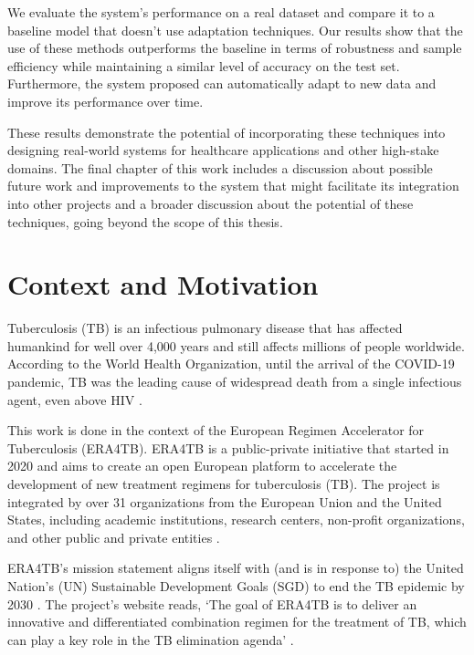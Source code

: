 \documentclass[../main.tex]{subfiles}
\begin{document}
 We evaluate the system's performance on a real dataset and compare it to a baseline model that doesn't use adaptation techniques.  Our results show that the use of these methods outperforms the baseline in terms of robustness and sample efficiency while maintaining a similar level of accuracy on the test set. Furthermore, the system proposed can automatically adapt to new data and improve its performance over time. 
 
 These results demonstrate the potential of incorporating these techniques into designing real-world systems for healthcare applications and other high-stake domains. The final chapter of this work includes a discussion about possible future work and improvements to the system that might facilitate its integration into other projects and a broader discussion about the potential of these techniques, going beyond the scope of this thesis.
    
 \section{Context and Motivation} \label{sec:motivation}

    Tuberculosis (TB) is an infectious pulmonary disease that has affected humankind for well over 4,000 years \cite{cdctb_world_2023} and still affects millions of people worldwide. According to the World Health Organization, until the arrival of the COVID-19 pandemic, TB was the leading cause of widespread death from a single infectious agent, even above HIV \cite{who_global_2022}.


    This work is done in the context of the European Regimen Accelerator for Tuberculosis (ERA4TB). ERA4TB is a public-private initiative that started in 2020 and aims to create an open European platform to accelerate the development of new treatment regimens for tuberculosis (TB). The project is integrated by over 31 organizations from the European Union and the United States, including academic institutions, research centers, non-profit organizations, and other public and private entities \cite{noauthor_era4tb}.
    
    ERA4TB's mission statement aligns itself with (and is in response to) the United Nation's (UN) Sustainable Development Goals (SGD) to end the TB epidemic by 2030 \cite{world_health_organization_regional_office_for_europe_tuberculosis_2017}. The project's website reads, `The goal of ERA4TB is to deliver an innovative and differentiated combination regimen for the treatment of TB, which can play a key role in the TB elimination agenda' \cite{noauthor_era4tb}.
\end{document}
